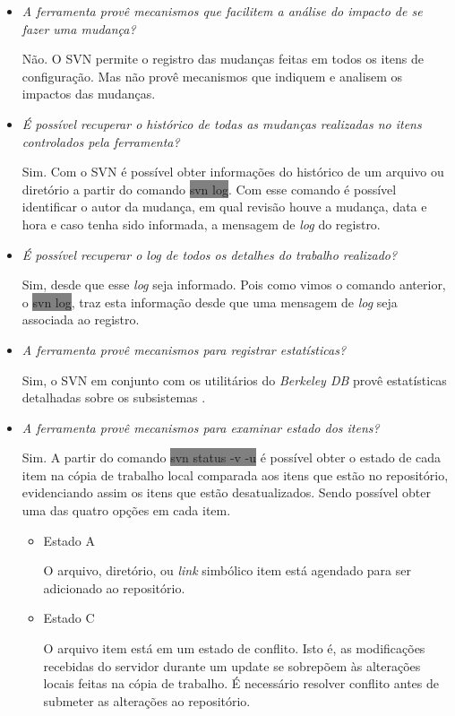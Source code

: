 \begin{itemize}
  \item \textit{A ferramenta provê mecanismos que facilitem a análise do impacto de se fazer uma mudança?}

      Não. O SVN permite o registro das mudanças feitas em todos os itens de configuração. Mas não provê mecanismos que indiquem e analisem os impactos das mudanças.
  \item \textit{É possível recuperar o histórico de todas as mudanças realizadas no itens controlados pela
  ferramenta?}

      Sim. Com o SVN é possível obter informações do histórico de um arquivo ou diretório a partir do comando \colorbox{Gray}{svn log}. Com esse comando é possível identificar o autor da mudança, em qual revisão houve a mudança, data e hora e caso tenha sido informada, a mensagem de \textit{log} do registro.

  \item \textit{É possível recuperar o log de todos os detalhes do trabalho realizado?}

      Sim, desde que esse \textit{log} seja informado. Pois como vimos o comando anterior, o \colorbox{Gray}{svn log}, traz esta informação desde que uma mensagem de \textit{log} seja associada ao registro.

  \item \textit{A ferramenta provê mecanismos para registrar estatísticas?}

      Sim, o SVN em conjunto com os utilitários do \textit{Berkeley DB} provê estatísticas detalhadas sobre os subsistemas \cite{svn-book}.

  \item \textit{A ferramenta provê mecanismos para examinar estado dos itens?}

      Sim. A partir do comando \colorbox{Gray}{svn status -v -u} é possível obter o estado de cada item na cópia de trabalho local comparada aos itens que estão no repositório, evidenciando assim os itens que estão desatualizados. Sendo possível obter uma das quatro opções em cada item.
        \begin{itemize}
          \item Estado A

          O arquivo, diretório, ou \textit{link} simbólico item está agendado para ser adicionado ao repositório.

          \item Estado C

          O arquivo item está em um estado de conflito. Isto é, as modificações recebidas do servidor durante um update se sobrepõem às alterações locais feitas na cópia de trabalho. É necessário resolver conflito antes de submeter as alterações ao repositório.


\end{itemize}
\end{itemize}
